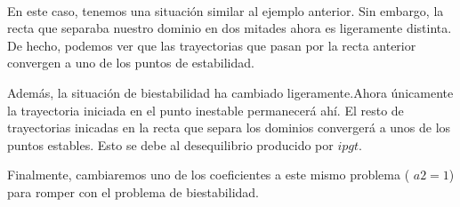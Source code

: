 \documentclass[11pt]{article}
\begin{document}
    \begin{center}
    \end{center}
    { \hspace*{\fill} \\}
    
    En este caso, tenemos una situación similar al ejemplo anterior. Sin
embargo, la recta que separaba nuestro dominio en dos mitades ahora es
ligeramente distinta. De hecho, podemos ver que las trayectorias que
pasan por la recta anterior convergen a uno de los puntos de
estabilidad.

Además, la situación de biestabilidad ha cambiado ligeramente.Ahora
únicamente la trayectoria iniciada en el punto inestable permanecerá
ahí. El resto de trayectorias inicadas en la recta que separa los
dominios convergerá a unos de los puntos estables. Esto se debe al
desequilibrio producido por \(ipgt\).

    Finalmente, cambiaremos uno de los coeficientes a este mismo problema (
\(a2=1\)) para romper con el problema de biestabilidad.
\end{document}
